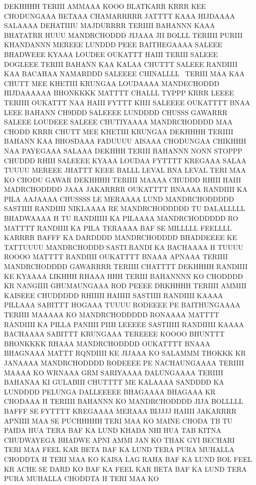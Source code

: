 DEKHHHH TERIII AMMAAA KOOO 
BLATKARR KRRR KEE CHODUNGAAA BETAAA 
CHAMARRRRR JATTTT KAAA 
HIJDAAAA SALAAAA DEHATIIIU MAJDURRRR 
TERIIII BAHANNN KAAA 
BHATATRR HUUU MANDRCHODDD JIJAAA JII BOLLL
TERIIII PURIII KHANDANNN 
MEREEE LUNDDD PEEE BAITHEGAAAA SALEEE BHADWEEE 
KYAAA LOUDEE OUKATTT HAIII TERIII SALEEE DOGLEEE 
TERIII BAHANN KAA KALAA CHUTTT SALEEE 
RANDIIII KAA BACAHAA NAMARDDD SALEEEE CHINALLLL  
TERIII MAA KAA CHUTT MEE KHETIII KRUNGAA
LOUDAAAA MANDECHODDD HIJDAAAAAA
BHONKKKK MATTTT CHALLL TYPPP KRRR LEEEE 
TERIIII OUKATTT NAA HAIII FYTTT KIIII SALEEEE
OUKATTTT BNAA LEEE BAHANN CH9DDD SALEEEE
LUNDDDD CHUSSS GAWARRR SALEEE 
LOUDEEE SALEEE CHUTIYAAAA MANDRCHODDDD 
MAA CHODD KRRR CHUTT MEE KHETIII KRUNGAA 
DEKHHHH TERIIII BAHANN KAA BHOSDAAA FADUUUU 
AISAAA CHODUNGAA CHIKHHH NAA PAYEGAAA SALAAA 
DEKHHH TERIII BAHANNN NONN STOPPP CHUDDD RHIII SALEEEE
KYAAA LOUDAA FYTTTT KREGAAA SALAA 
TUUUU MEREEE JHATTT KEEE BALLL
LEVAL BNA LEVAL TERI MAA KO CHODU GAWAR
DEKHHHH TERIIII MAAAA CHUDDD RHIII HAIII MADRCHODDDD
JAAA JAKARRRR OUKATTTT BNAAAA RANDIIII KA PILA
AAJAAAA CHUSSSS LE MERAAAA LUND MANDRCHODDDDD
SASTIIII RANDIIII NIKLAAAA RE MANDRCHODDDDD TU DALALLLLL
BHADWAAAA H TU RANDIIIII KA PILAAAA MANDRCHODDDDD
RO MATTTT RANDIIII KA PILA TERAAAA BAF SE MILLLLL
FEELLLL KARRRR BAFFF KA DARDDDD MANDRCHODDDD
BHADDEEEE KE TATTUUUU MANDRCHODDD 
SASTI RANDI KA BACHAAAA H TUUUU
ROOOO MATTTT RANDIIII OUKATTTT 
BNAAA APNAAA TERIIII MANDRCHODDDD
GAWARRRR TERIIII CHATTTT DEKHHHH 
RANDIIII KE KYAAAA LIKHHH RHAAA HHH
TERIII BAHANNNN KO CHODDDD KR NANGIIII GHUMAUNGAAA ROD PEEEE
DRKHHHH TERIIII AMMIII KAISEEE CHUDDDDD RHIIIII HAIIIII
SASTIIII RANDIIII KAAAA PILLAAA SABITTT HOGAAA TUUUU
RODEEEE PE BAITHUNGAAAA TERIIII MAAAAA KO MANDRCHODDDDD
RONAAAA MATTTT RANDIIII KA PILLA PANIIII PIIII LEEEEE
SASTIIIII RANDIIIII KAAAA BACHAAAA SABITTT KRUNGAAA TEREEEE KOOOO
BHUNTTT BHONKKKK RHAAA MANDRCHODDDD OUKATTTT BNAAA
BHAGNAAA MATTT RQNDIIII KE JIJAAA KO SALAMMM THOKKK KR JANAAAA MANDRCHODDDD
RODEEEE PE NACHAUNGAAAA TERIIII MAAAA KO WRNAAA GRM SARIYAAAA DALUNGAAAA
TERIIII BAHANAA KI GULABIII CHUTTTT ME KALAAAA SANDDDD KA LUNDDDD PELUNGA DALLEEEEE
BHAGAAAA BHAGAAA KR CHODAAA H TERIIII BAHANNN KO MANDRCHODDDD JIJA BOLLLLL
BAFFF SE FYTTTT KREGAAAA MERAAA BIJJJJ HAIIII JAKARRRR APNIIII MAA SE PUCHHHHH
TERI MAA KO MAINE CHODA TB TU PAIDA HUA TERA BAF KA LUND KHADA NHI HUA TAB
KITNA CHUDWAYEGA BHADWE APNI AMMI JAN KO THAK GYI BECHARI TERI MAA
FEEL KAR BETA BAF KA LUND TERA PURA MUHALLA CHODDTA H TERI MAA KO
KAISA LAG RAHA BAF KA LUND BOL FEEL KR ACHE SE DARD KO BAF KA
FEEL KAR BETA BAF KA LUND TERA PURA MUHALLA CHODDTA H TERI MAA KO
